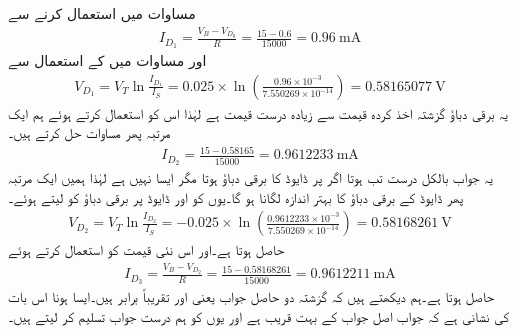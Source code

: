 مساوات   میں  استعمال کرنے سے
\begin{align*}
I_{D_1}=\frac{V_B-V_{D_0}}{R}=\frac{15-0.6}{15000}=\SI{0.96}{\milli \ampere}
\end{align*}
اور مساوات   میں  کے استعمال سے
\begin{align*}
V_{D_1}=V_T \ln \frac{I_{D_1}}{I_S}=0.025 \times \ln \left (\frac{0.96 \times 10^{-3}}{7.550269 \times 10^{-14}} \right )=\SI{0.58165077}{\volt}
\end{align*}
یہ برقی دباؤ گزشتہ اخذ کردہ قیمت سے زیادہ درست قیمت ہے لہٰذا اس کو استعمال کرتے ہوئے ہم ایک مرتبہ پھر مساوات  حل کرتے ہیں۔
\begin{align*}
I_{D_2}=\frac{15-0.58165}{15000}=\SI{0.9612233}{\milli \ampere}
\end{align*}
یہ جواب بالکل درست تب ہوتا اگر  پر ڈایوڈ کا برقی دباؤ  ہوتا مگر ایسا نہیں ہے لہٰذا ہمیں ایک مرتبہ پھر ڈایوڈ کے برقی دباؤ کا بہتر اندازہ لگانا ہو گا۔یوں  کو  اور  ڈایوڈ پر برقی دباؤ کو  لیتے ہوئے۔
\begin{align*}
V_{D_2}=V_T \ln \frac{I_{D_2}}{I_S}=-0.025 \times \ln \left ( \frac{0.9612233 \times 10^{-3}}{7.550269 \times 10^{-14}} \right )=\SI{0.58168261}{\volt}
\end{align*}
حاصل ہوتا ہے۔اور اس نئی قیمت کو استعمال کرتے ہوئے
\begin{align*}
I_{D_3}=\frac{V_B-V_{D_2}}{R}=\frac{15-0.58168261}{15000}=\SI{0.9612211}{\milli \ampere}
\end{align*}
حاصل ہوتا ہے۔ہم دیکھتے ہیں کہ گزشتہ دو حاصل جواب یعنی  اور  تقریباً برابر ہیں۔ایسا ہونا اس بات کی نشانی ہے کہ جواب اصل جواب کے بہت قریب ہے اور یوں  کو ہم درست جواب تسلیم کر لیتے ہیں۔


